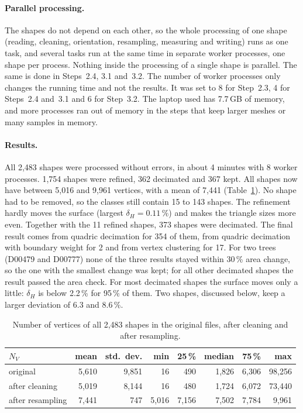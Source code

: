 \documentclass[10pt,a4paper]{article}
\begin{document}
\paragraph{Parallel processing.} The shapes do not depend on each other, so the whole processing of one shape (reading,
cleaning, orientation, resampling, measuring and writing) runs as one task, and several tasks run at the same time in separate
worker processes, one shape per process. Nothing inside the processing of a single shape is parallel. The same is done in
Steps~2.4, 3.1 and~3.2. The number of worker processes only changes the running time and not the results. It was set to 8 for
Step~2.3, 4 for Steps~2.4 and~3.1 and 6 for Step~3.2. The laptop used has 7.7\,GB of memory, and more processes ran out of
memory in the steps that keep larger meshes or many samples in memory.

\paragraph{Results.} All 2,483 shapes were processed without errors, in about 4 minutes with 8 worker processes. 1,754 shapes
were refined, 362 decimated and 367 kept. All shapes now have between 5,016 and 9,961 vertices, with a mean of 7,441
(Table~\ref{tab:s23results}). No shape had to be removed, so the classes still contain 15 to 143 shapes. The refinement hardly
moves the surface (largest $\delta_H = 0.11\,\%$) and makes the triangle sizes more even. Together with the 11 refined shapes, 373 shapes were
decimated. The final result comes from quadric decimation for 354 of them, from quadric decimation with boundary weight for 2 and from vertex clustering for 17. For two trees
(D00479 and D00777) none of the three results stayed within 30\,\% area change, so the one with the smallest change was kept;
for all other decimated shapes the result passed the area check. For most decimated shapes the surface
moves only a little: $\delta_H$ is below 2.2\,\% for 95\,\% of them. Two shapes, discussed below, keep a larger deviation of
6.3 and 8.6\,\%.

\begin{table}[htbp]\centering\small
\begin{tabular}{@{}lrrrrrrr@{}}\toprule
$N_V$ & mean & std.\ dev. & min & 25\,\% & median & 75\,\% & max\\\midrule
original        & 5,610 & 9,851 & 16    & 490   & 1,826 & 6,306 & 98,256\\
after cleaning  & 5,019 & 8,144 & 16    & 480   & 1,724 & 6,072 & 73,440\\
after resampling & 7,441 & 747  & 5,016 & 7,156 & 7,502 & 7,784 & 9,961\\
\bottomrule\end{tabular}
\caption{Number of vertices of all 2,483 shapes in the original files, after cleaning and after resampling.}\label{tab:s23results}
\end{table}
\end{document}
